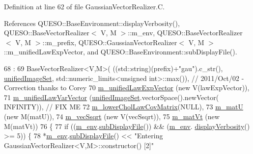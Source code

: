 Definition at line 62 of file Gaussian\-Vector\-Realizer.\-C.



References Q\-U\-E\-S\-O\-::\-Base\-Environment\-::display\-Verbosity(), Q\-U\-E\-S\-O\-::\-Base\-Vector\-Realizer$<$ V, M $>$\-::m\-\_\-env, Q\-U\-E\-S\-O\-::\-Base\-Vector\-Realizer$<$ V, M $>$\-::m\-\_\-prefix, Q\-U\-E\-S\-O\-::\-Gaussian\-Vector\-Realizer$<$ V, M $>$\-::m\-\_\-unified\-Law\-Exp\-Vector, and Q\-U\-E\-S\-O\-::\-Base\-Environment\-::sub\-Display\-File().


\begin{DoxyCode}
68   :
69   BaseVectorRealizer<V,M>( ((std::string)(prefix)+\textcolor{stringliteral}{"gau"}).c\_str(), 
      \hyperlink{class_q_u_e_s_o_1_1_base_vector_realizer_ad958991bab8d6369e8a0d66b22a237d4}{unifiedImageSet}, std::numeric\_limits<unsigned int>::max()), \textcolor{comment}{// 2011/Oct/02 - Correction
       thanks to Corey}
70   \hyperlink{class_q_u_e_s_o_1_1_gaussian_vector_realizer_ae1e6e0b9c268ced4a2192a9bcbd37668}{m\_unifiedLawExpVector}  (\textcolor{keyword}{new} V(lawExpVector)),
71   \hyperlink{class_q_u_e_s_o_1_1_gaussian_vector_realizer_a80276355d3e24953ed7be0749a554d85}{m\_unifiedLawVarVector}  (\hyperlink{class_q_u_e_s_o_1_1_base_vector_realizer_ad958991bab8d6369e8a0d66b22a237d4}{unifiedImageSet}.vectorSpace().newVector( 
      INFINITY)), \textcolor{comment}{// FIX ME}
72   \hyperlink{class_q_u_e_s_o_1_1_gaussian_vector_realizer_ac5cc90b95dddd02a987f45af652f4495}{m\_lowerCholLawCovMatrix}(NULL),
73   \hyperlink{class_q_u_e_s_o_1_1_gaussian_vector_realizer_a62aebd74fe00824ceed9724b8c41cfa7}{m\_matU}                 (\textcolor{keyword}{new} M(matU)),
74   \hyperlink{class_q_u_e_s_o_1_1_gaussian_vector_realizer_a473a7c1e61dd0b311bb7da6c244cb53d}{m\_vecSsqrt}             (\textcolor{keyword}{new} V(vecSsqrt)),
75   \hyperlink{class_q_u_e_s_o_1_1_gaussian_vector_realizer_aa121afe8cf67cea2a52552b4d12d57b8}{m\_matVt}                (\textcolor{keyword}{new} M(matVt))
76 \{
77   \textcolor{keywordflow}{if} ((\hyperlink{class_q_u_e_s_o_1_1_base_vector_realizer_acde246c52f82d8ed687d91cfac14c29c}{m\_env}.\hyperlink{class_q_u_e_s_o_1_1_base_environment_a8a0064746ae8dddfece4229b9ad374d6}{subDisplayFile}()) && (\hyperlink{class_q_u_e_s_o_1_1_base_vector_realizer_acde246c52f82d8ed687d91cfac14c29c}{m\_env}.
      \hyperlink{class_q_u_e_s_o_1_1_base_environment_a1fe5f244fc0316a0ab3e37463f108b96}{displayVerbosity}() >= 5)) \{
78     *\hyperlink{class_q_u_e_s_o_1_1_base_vector_realizer_acde246c52f82d8ed687d91cfac14c29c}{m\_env}.\hyperlink{class_q_u_e_s_o_1_1_base_environment_a8a0064746ae8dddfece4229b9ad374d6}{subDisplayFile}() << \textcolor{stringliteral}{"Entering GaussianVectorRealizer<V,M>::constructor() [2]"}

\end{DoxyCode}
